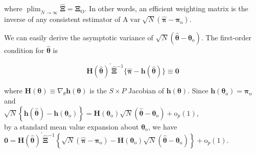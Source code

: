 \documentclass[10pt]{article}
\begin{document}
where $\operatorname{plim}_{N \rightarrow \infty} \hat{\boldsymbol{\Xi}}=\boldsymbol{\Xi}_{\mathrm{O}}$. In other words, an efficient weighting matrix is the inverse of any consistent estimator of $\mathrm{A} \operatorname{var} \sqrt{N}\left(\hat{\boldsymbol{\pi}}-\boldsymbol{\pi}_{\mathrm{o}}\right)$.

We can easily derive the asymptotic variance of $\sqrt{N}\left(\hat{\boldsymbol{\theta}}-\boldsymbol{\theta}_{\mathrm{o}}\right)$. The first-order condition for $\hat{\boldsymbol{\theta}}$ is


\begin{equation*}
\mathbf{H}(\hat{\boldsymbol{\theta}})^{\prime} \hat{\boldsymbol{\Xi}}^{-1}\{\hat{\boldsymbol{\pi}}-\mathbf{h}(\hat{\boldsymbol{\theta}})\} \equiv \mathbf{0} \tag{14.65}
\end{equation*}


where $\mathbf{H}(\boldsymbol{\theta}) \equiv \nabla_{\theta} \mathbf{h}(\boldsymbol{\theta})$ is the $S \times P$ Jacobian of $\mathbf{h}(\boldsymbol{\theta})$. Since $\mathbf{h}\left(\boldsymbol{\theta}_{\mathrm{o}}\right)=\boldsymbol{\pi}_{\mathrm{o}}$ and\\
$\sqrt{N}\left\{\mathbf{h}(\hat{\boldsymbol{\theta}})-\mathbf{h}\left(\boldsymbol{\theta}_{\mathrm{o}}\right)\right\}=\mathbf{H}\left(\boldsymbol{\theta}_{\mathrm{o}}\right) \sqrt{N}\left(\hat{\boldsymbol{\theta}}-\boldsymbol{\theta}_{\mathrm{o}}\right)+\mathrm{o}_{p}(1)$,\\
by a standard mean value expansion about $\boldsymbol{\theta}_{\mathrm{o}}$, we have\\
$\mathbf{0}=\mathbf{H}(\hat{\boldsymbol{\theta}})^{\prime} \hat{\boldsymbol{\Xi}}^{-1}\left\{\sqrt{N}\left(\hat{\boldsymbol{\pi}}-\boldsymbol{\pi}_{\mathrm{o}}\right)-\mathbf{H}\left(\boldsymbol{\theta}_{\mathrm{o}}\right) \sqrt{N}\left(\hat{\boldsymbol{\theta}}-\boldsymbol{\theta}_{\mathrm{o}}\right)\right\}+\mathrm{o}_{p}(1)$.
\end{document}
